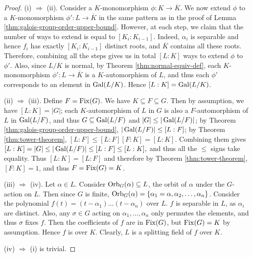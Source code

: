 
\begin{proof}
	
	
	
	(i) $\Rightarrow$ (ii). Consider a $K$-monomorphism $\phi: K \to \overline{K}$. We now extend $\phi$ to a $K$-monomorphism $\phi':L \to \overline{K}$ in the same pattern as in the proof of Lemma \ref{thm:galois-group-order-upper-bound}. However, at each step, we claim that the number of ways to extend is equal to $[K_i : K_{i-1}]$. Indeed, $\alpha_i$ is separable and hence $f_i$ has exactly $[K_i : K_{i-1}]$ distinct roots, and $\overline K$ contains all these roots. Therefore, combining all the steps gives us in total $[L:K]$ ways to extend $\phi$ to $\phi'$. Also, since $L/K$ is normal, by Theorem \ref{thm:normal-equiv-def}, each $K$-monomorphism $\phi': L \to \overline{K}$ is a $K$-automorphism of $L$, and thus each $\phi'$ corresponds to an element in $\operatorname{Gal}(L/K)$. Hence $[L:K] = \operatorname{Gal}(L/K)$. 
	
	(ii) $\Rightarrow$ (iii). Define $F= \operatorname{Fix}(G)$. We have $K \subseteq F \subseteq G$. Then by assumption, we have $[L:K] = |G|$; each $K$-automorphism of $L$ in $G$ is also a $F$-automorphism of $L$ in $\operatorname{Gal}(L/F)$, and thus $G \subseteq \operatorname{Gal}(L / F)$ and $|G| \le |\operatorname{Gal}(L / F)|$; by Theorem \ref{thm:galois-group-order-upper-bound}, $|\operatorname{Gal}(L/F)| \le [L:F]$; by Theorem \ref{thm:tower-theorem},  $ [L:F] \le [L:F][F:K] = [L:K]$. Combining them gives $
	[L:K] = |G| \le |\operatorname{Gal}(L/F)| \le  [L:F] \le [L:K],
	$
	and thus all the $\le$ signs take equality.  
	Thus $[L:K]=[L:F]$ and therefore by Theorem \ref{thm:tower-theorem}, $[F:K] = 1$, and thus $F=\operatorname{Fix}(G) = K$.
	
	(iii) $\Rightarrow$ (iv). Let $\alpha \in L$. Consider $\operatorname{Orb}_G(\alpha) \subseteq L$, the orbit of $\alpha$ under the $G$-action on $L$. Then since $G$ is finite, $\operatorname{Orb}_G(\alpha) = \{ \alpha_1 = \alpha, \alpha_2, \ldots, \alpha_n\}$. Consider the polynomial $f(t) = (t-\alpha_1) \ldots (t-\alpha_n)$ over $L$.  $f$ is separable in $L$, as $\alpha_i$ are distinct. Also, any $\sigma \in G$ acting on $\alpha_1, \dots, \alpha_n$ only permutes the elements, and thus $\sigma$ fixes $f$. Then the coefficients of $f$ are in $\operatorname{Fix}(G)$, but $\operatorname{Fix}(G) = K$ by assumption. Hence $f$ is over $K$. Clearly, $L$ is a splitting field of $f$ over $K$. 
	
	(iv) $\Rightarrow$ (i) is trivial.
\end{proof}


